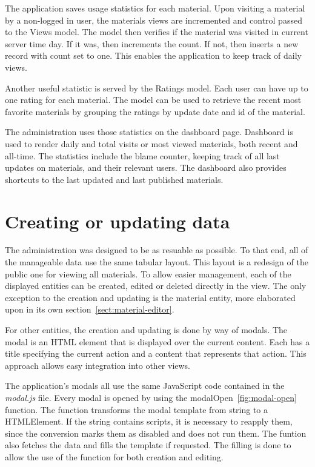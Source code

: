 \documentclass[
  digital,     %
  oneside,     %
  nosansbold,  %
  colorbold, %
  lof,         %
  lot,         %
]{fithesis4}
\begin{document}
The application saves usage statistics for each material. Upon visiting a material by a non-logged in user, the materials views are incremented and control passed to the Views model. The model then verifies if the material was visited in current server time day. If it was, then increments the count. If not, then inserts a new record with count set to one. This enables the application to keep track of daily views.

Another useful statistic is served by the Ratings model. Each user can have up to one rating for each material. The model can be used to retrieve the recent most favorite materials by grouping the ratings by update date and id of the material.

The administration uses those statistics on the dashboard page. Dashboard is used to render daily and total visits or most viewed materials, both recent and all-time. The statistics include the blame counter, keeping track of all last updates on materials, and their relevant users. The dashboard also provides shortcuts to the last updated and last published materials.

\section{Creating or updating data}
\label{sect:data-management}

The administration was designed to be as resuable as possible. To that end, all of the manageable data use the same tabular layout. This layout is a redesign of the public one for viewing all materials. To allow easier management, each of the displayed entities can be created, edited or deleted directly in the view. The only exception to the creation and updating is the material entity, more elaborated upon in its own section~\ref{sect:material-editor}.

For other entities, the creation and updating is done by way of modals. The modal is an HTML element that is displayed over the current content. Each has a title specifying the current action and a content that represents that action. This approach allows easy integration into other views.

The application's modals all use the same JavaScript code contained in the \textit{modal.js} file. Every modal is opened by using the modalOpen~\ref{fig:modal-open} function. The function transforms the modal template from string to a HTMLElement. If the string contains scripts, it is necessary to reapply them, since the conversion marks them as disabled and does not run them. The funtion also fetches the data and fills the template if requested. The filling is done to allow the use of the function for both creation and editing.
\end{document}
